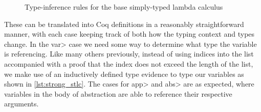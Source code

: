   \begin{figure}
    \caption{Type-inference rules for the base simply-typed lambda calculus}
    \label{fig:base_infer}
  \end{figure}

  These can be translated into Coq definitions in a reasonably straightforward manner, with each case keeping track of both how the typing context and types change.
  In the \<var> case we need some way to determine what type the variable is referencing.
  Like many others previously\cite{Benton2011}\cite{Coquand1994}, instead of using indices into the list accompanied with a proof that the index does not exceed the length of the list, we make use of an inductively defined type evidence to type our variables as shown in \ref{lst:strong_stlc}.
  The cases for \<app> and \<abs> are as expected, where variables in the body of abstraction are able to reference their respective arguments.

